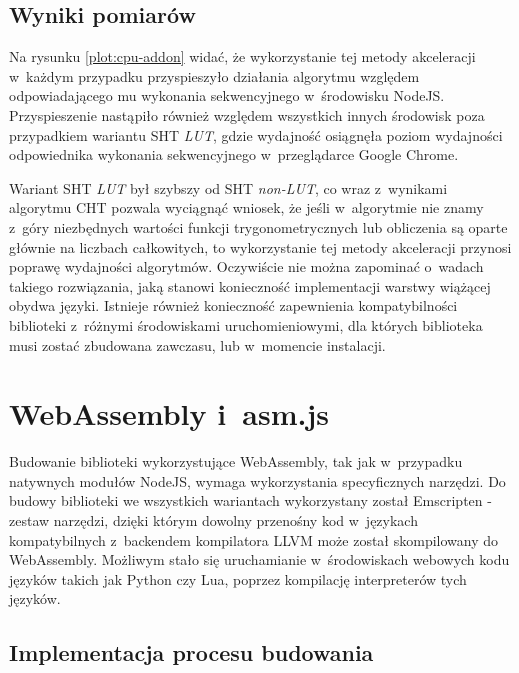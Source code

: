 

\subsection{Wyniki pomiarów}

Na rysunku \ref{plot:cpu-addon} widać, że wykorzystanie tej metody akceleracji w~każdym przypadku przyspieszyło działania algorytmu względem odpowiadającego mu wykonania sekwencyjnego w~środowisku NodeJS. Przyspieszenie nastąpiło również względem wszystkich innych środowisk poza przypadkiem wariantu SHT \textit{LUT}, gdzie wydajność osiągnęła poziom wydajności odpowiednika wykonania sekwencyjnego w~przeglądarce Google Chrome.

Wariant SHT \textit{LUT} był  szybszy od SHT \textit{non-LUT}, co wraz z~wynikami algorytmu CHT pozwala wyciągnąć wniosek, że jeśli w~algorytmie nie znamy z~góry niezbędnych wartości funkcji trygonometrycznych lub obliczenia są oparte głównie na liczbach całkowitych, to wykorzystanie tej metody akceleracji przynosi poprawę wydajności algorytmów. Oczywiście nie można zapominać o~wadach takiego rozwiązania, jaką stanowi konieczność implementacji warstwy wiążącej obydwa języki. Istnieje również konieczność zapewnienia kompatybilności biblioteki z~różnymi środowiskami uruchomieniowymi, dla których biblioteka musi zostać zbudowana zawczasu, lub w~momencie instalacji.

\section{WebAssembly i~asm.js}

Budowanie biblioteki wykorzystujące WebAssembly, tak jak w~przypadku natywnych modułów NodeJS, wymaga wykorzystania specyficznych narzędzi. Do budowy biblioteki we wszystkich wariantach wykorzystany został Emscripten \cite{emscripten} - zestaw narzędzi, dzięki którym dowolny przenośny kod w~językach kompatybilnych z~backendem kompilatora LLVM może został skompilowany do WebAssembly. Możliwym stało się uruchamianie w~środowiskach webowych kodu języków takich jak Python czy Lua, poprzez kompilację interpreterów tych języków.

\subsection{Implementacja procesu budowania}


